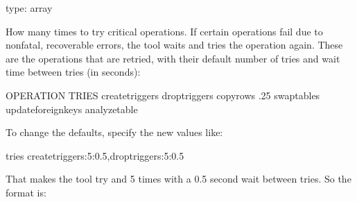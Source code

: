 \documentclass[letterpaper,10pt,english]{sphinxmanual}
\begin{document}

\begin{fulllineitems}
\label{\detokenize{mariadb-schema-change:cmdoption-mariadb-schema-change-tries}}
\sphinxAtStartPar
type: array

\sphinxAtStartPar
How many times to try critical operations.  If certain operations fail due
to non\sphinxhyphen{}fatal, recoverable errors, the tool waits and tries the operation
again.  These are the operations that are retried, with their default number
of tries and wait time between tries (in seconds):

\begin{sphinxVerbatim}[commandchars=\\\{\}]
OPERATION            TRIES   
     
create\PYGZus{}triggers               
drop\PYGZus{}triggers                 
copy\PYGZus{}rows                  .25
swap\PYGZus{}tables                   
update\PYGZus{}foreign\PYGZus{}keys           
analyze\PYGZus{}table                 
\end{sphinxVerbatim}

\sphinxAtStartPar
To change the defaults, specify the new values like:

\begin{sphinxVerbatim}[commandchars=\\\{\}]
\PYGZhy{}\PYGZhy{}tries create\PYGZus{}triggers:5:0.5,drop\PYGZus{}triggers:5:0.5
\end{sphinxVerbatim}

\sphinxAtStartPar
That makes the tool try  and  5 times
with a 0.5 second wait between tries.  So the format is:


\end{fulllineitems}
\end{document}
